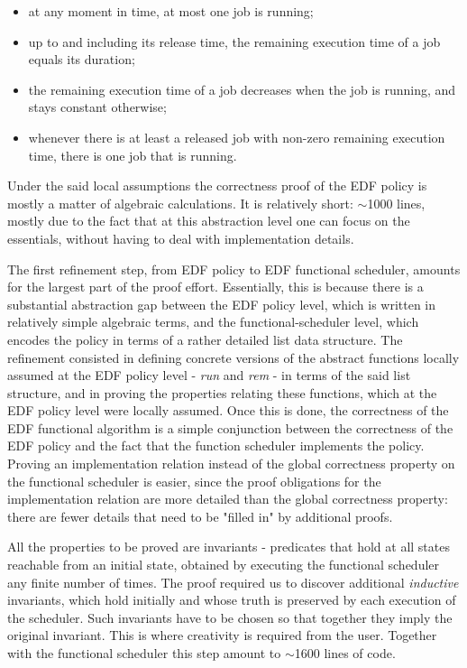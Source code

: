	\begin{itemize}
		\item at any moment in time, at most one job is running;
		\item up to and including its release time, the remaining execution time of a job equals its duration;
		\item the remaining execution time of a job decreases when the job is running, and stays constant otherwise;
		\item whenever there is at least a released job with non-zero remaining execution time, there is one job that is running.
	\end{itemize}

	Under the said local assumptions the correctness proof of the EDF policy is mostly a matter of algebraic calculations. It is relatively short: $\sim$1000 lines, mostly due to the fact that at this abstraction level one can focus on the essentials, without having to deal with implementation details.

	The first refinement step, from EDF policy to EDF functional scheduler, amounts for the largest part of the proof effort. Essentially, this is because there is a substantial abstraction gap between the EDF policy level, which is written in relatively simple algebraic terms, and the functional-scheduler level, which encodes the policy in terms of a rather detailed list data structure. The refinement consisted in defining concrete versions of the abstract functions locally assumed at the EDF policy level - \emph{run} and \emph{rem} - in terms of the said list structure, and in proving the properties relating these functions, which at the EDF policy level were locally assumed. Once this is done, the correctness of the EDF functional algorithm is a simple conjunction between the correctness of the EDF policy and the fact that the function scheduler implements the policy. Proving an implementation relation instead of the global correctness property on the functional scheduler is easier, since the proof obligations for the implementation relation are more detailed than the global correctness property: there are fewer details that need to be "filled in" by additional proofs.

	All the properties to be proved are invariants - predicates that hold at all states reachable from an initial state, obtained by executing the functional scheduler any finite number of times. The proof required us to discover additional \emph{inductive} invariants, which hold initially and whose truth is preserved by each execution of the scheduler. Such invariants have to be chosen so that together they imply the original invariant. This is where creativity is required from the user. Together with the functional scheduler this step amount to $\sim$1600 lines of code.

